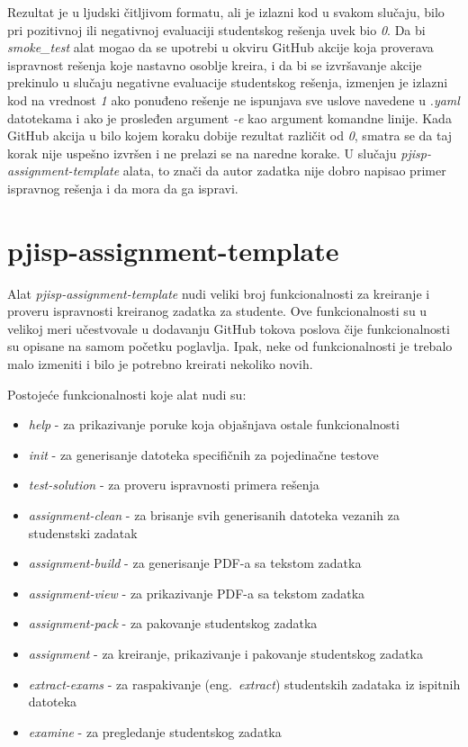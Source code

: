 \documentclass[12pt]{report}
\begin{document}
Rezultat je u ljudski čitljivom formatu, ali je izlazni kod u svakom slučaju, bilo pri pozitivnoj ili negativnoj evaluaciji studentskog rešenja uvek bio \textit{0}. Da bi \textit{smoke\_test} alat mogao da se upotrebi u okviru GitHub akcije koja proverava ispravnost rešenja koje nastavno osoblje kreira, i da bi se izvršavanje akcije prekinulo u slučaju negativne evaluacije studentskog rešenja, izmenjen je izlazni kod na vrednost \textit{1} ako ponuđeno rešenje ne ispunjava sve uslove navedene u \textit{.yaml} datotekama i ako je prosleđen argument \textit{-e} kao argument komandne linije. Kada GitHub akcija u bilo kojem koraku dobije rezultat različit od \textit{0}, smatra se da taj korak nije uspešno izvršen i ne prelazi se na naredne korake. U slučaju \textit{pjisp-assignment-template} alata, to znači da autor zadatka nije dobro napisao primer ispravnog rešenja i da mora da ga ispravi.

\section{pjisp-assignment-template}
Alat \textit{pjisp-assignment-template} nudi veliki broj funkcionalnosti za kreiranje i proveru ispravnosti kreiranog zadatka za studente. Ove funkcionalnosti su u velikoj meri učestvovale u dodavanju GitHub tokova poslova čije funkcionalnosti su opisane na samom početku poglavlja. Ipak, neke od funkcionalnosti je trebalo malo izmeniti i bilo je potrebno kreirati nekoliko novih.

Postojeće funkcionalnosti koje alat nudi su:

\begin{itemize}
    \item \textit{help} - za prikazivanje poruke koja objašnjava ostale funkcionalnosti
    \item \textit{init} - za generisanje datoteka specifičnih za pojedinačne testove
    \item \textit{test-solution} - za proveru ispravnosti primera rešenja
    \item \textit{assignment-clean} - za brisanje svih generisanih datoteka vezanih za studenstski zadatak
    \item \textit{assignment-build} - za generisanje PDF-a sa tekstom zadatka
    \item \textit{assignment-view} - za prikazivanje PDF-a sa tekstom zadatka
    \item \textit{assignment-pack} - za pakovanje studentskog zadatka
    \item \textit{assignment} - za kreiranje, prikazivanje i pakovanje studentskog zadatka
    \item \textit{extract-exams} - za raspakivanje (eng.\ \textit{extract}) studentskih zadataka iz ispitnih datoteka
    \item \textit{examine} - za pregledanje studentskog zadatka
\end{itemize}
\end{document}
